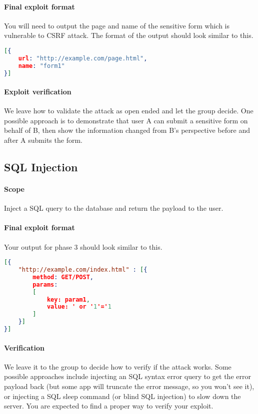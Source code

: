 \documentclass{article}[10pt]
\begin{document}
\paragraph{Final exploit format} You will need to output the page and name of the sensitive form which is vulnerable to CSRF attack. The format of the output should look similar to this.

\begin{lstlisting}[language=json,firstnumber=1]
[{
	url: "http://example.com/page.html",
	name: "form1"
}]
\end{lstlisting}

\paragraph{Exploit verification} We leave how to validate the attack as open ended and let the group decide. One possible approach is to demonstrate that user A can submit a sensitive form on behalf of B, then show the information changed from B's perspective before and after A submits the form.

\subsection{SQL Injection}
\paragraph{Scope} Inject a SQL query to the database and return the payload to the user.

\paragraph{Final exploit format} Your output for phase 3 should look similar to this.

\begin{lstlisting}[language=json,firstnumber=1]
[{
	"http://example.com/index.html" : [{
		method: GET/POST,
		params: 
		[
			key: param1,
			value: ' or '1'='1
		]
	}]
}]
\end{lstlisting}

\paragraph{Verification} We leave it to the group to decide how to verify if the attack works. Some possible approaches include injecting an SQL syntax error query to get the error payload back (but some app will truncate the error message, so you won't see it), or injecting a SQL sleep command (or blind SQL injection) to slow down the server. You are expected to find a proper way to verify your exploit.
\end{document}
